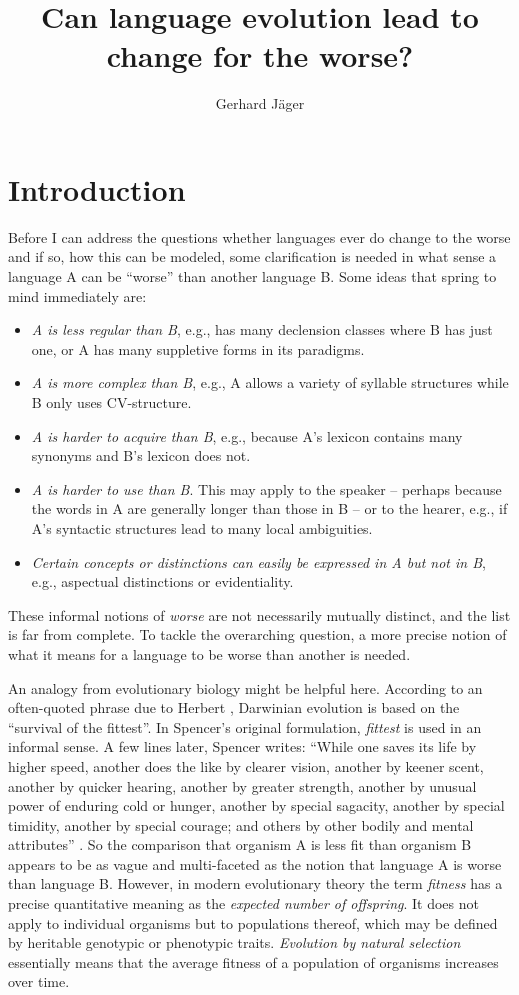 \documentclass[output=paper,hidelinks]{langscibook}
\author{Gerhard Jäger\affiliation{University of Tübingen}}
\title{Can language evolution lead to change for the worse?}
\begin{document}
\maketitle

\section{Introduction}

Before I can address the questions whether languages ever do change to the worse and if
so, how this can be modeled, some clarification is needed in what sense a language A can
be ``worse'' than another language B. Some ideas that spring to mind immediately are:
\begin{itemize}
\item \emph{A is less regular than B}, e.g., has many declension classes where B has just
  one, or A has many suppletive forms in its paradigms.
\item \emph{A is more complex than B}, e.g., A allows a variety of syllable structures
  while B only uses CV-structure.
\item \emph{A is harder to acquire than B}, e.g., because A's lexicon contains many
  synonyms and B's lexicon does not.
\item \emph{A is harder to use than B}. This may apply to the speaker -- perhaps because
  the words in A are generally longer than those in B -- or to the hearer, e.g., if A's
  syntactic structures lead to many local ambiguities.
\item \emph{Certain concepts or distinctions can easily be expressed in A but not in B},
  e.g., aspectual distinctions or evidentiality.
\end{itemize}

These informal notions of \emph{worse} are not necessarily mutually distinct, and the list
is far from complete. To tackle the overarching question, a more precise notion of what it
means for a language to be worse than another is needed.

An analogy from evolutionary biology might be helpful here. According to an often-quoted
phrase due to Herbert \citet[453]{spencer1875}, Darwinian evolution is based on
the ``survival of the fittest''. In Spencer's original formulation, \emph{fittest} is used
in an informal sense. A few lines later, Spencer writes: ``While one saves its life by
higher speed, another does the like by clearer vision, another by keener scent, another by
quicker hearing, another by greater strength, another by unusual power of enduring cold or
hunger, another by special sagacity, another by special timidity, another by special
courage; and others by other bodily and mental attributes'' \citep[454]{spencer1875}. So
the comparison that organism A is less fit than organism B appears to be as vague and
multi-faceted as the notion that language A is worse than language B. However, in modern
evolutionary theory the term \emph{fitness} has a precise quantitative meaning as the
\emph{expected number of offspring}. It does not apply to individual organisms but to
populations thereof, which may be defined by heritable genotypic or phenotypic
traits. \emph{Evolution by natural selection} essentially means that the average fitness
of a population of organisms increases over time.
\end{document}
